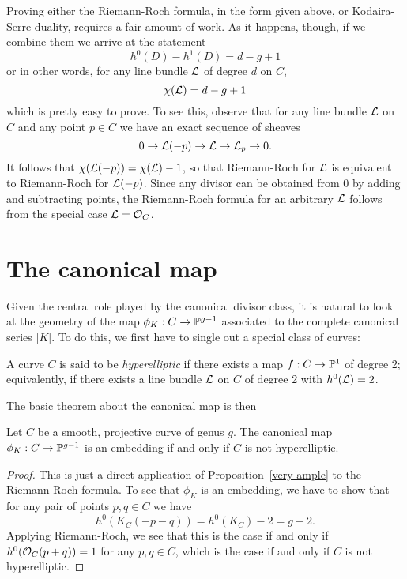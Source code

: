 \documentclass[12pt, leqno]{book}
\def\cL{{\cal L}}
\begin{document}
Proving either the Riemann-Roch formula, in the form given above, or Kodaira-Serre duality, requires a fair amount of work. As it happens, though, if we combine them we arrive at the statement
$$
h^0(D) - h^1(D) = d-g+1
$$
or in other words, for any line bundle $\cL$ of degree $d$ on $C$,
$$
\chi(\cL) = d-g+1
$$
which is pretty easy to prove. To see this, observe that for any line bundle $\cL$ on $C$ and any point $p \in C$ we have an exact sequence of sheaves
$$
0 \to \cL(-p) \to \cL \to \cL_p \to 0.
$$
It follows that $\chi(\cL(-p)) = \chi(\cL) - 1$, so that Riemann-Roch for $\cL$ is equivalent to Riemann-Roch for $\cL(-p)$. Since any divisor can be obtained from 0 by adding and subtracting points, the Riemann-Roch formula for an arbitrary $\cL$ follows from the special case $\cL = \cO_C$.

\section{The canonical map}

Given the central role played by the canonical divisor class, it is natural to look at the geometry of the map $\phi_K : C \to \PP^{g-1}$ associated to the complete canonical series $|K|$. To do this, we first have to single out a special class of curves:

\begin{definition}
A curve $C$ is said to be \emph{hyperelliptic} if there exists a map $f : C \to \PP^1$ of degree 2; equivalently, if there exists a line bundle $\cL$ on $C$ of degree 2 with $h^0(\cL) = 2$.
\end{definition}

The basic theorem about the canonical map is then

\begin{proposition}
Let $C$ be a smooth, projective curve of genus $g$. The canonical map $\phi_K : C \to \PP^{g-1}$ is an embedding if and only if $C$ is not hyperelliptic.
\end{proposition}

\begin{proof}
This is just a direct application of Proposition~\ref{very ample} to the Riemann-Roch formula. To see that $\phi_K$ is an embedding, we have to show that for any pair of points $p, q \in C$ we have
$$
h^0(K_C(-p-q)) = h^0(K_C)-2 = g-2.
$$
Applying Riemann-Roch, we see that this is the case if and only if $h^0(\cO_C(p+q)) = 1$ for any $p,q \in C$, which is the case if and only if $C$ is not hyperelliptic.
\end{proof}
\end{document}
